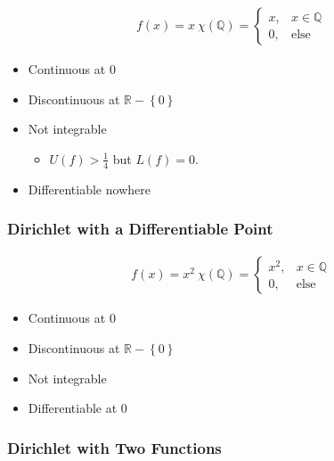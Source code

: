 \begin{align*}
f ( x ) = x~\chi({\mathbb{Q}}) = 
\begin{cases}
x, & x\in {\mathbb{Q}}\\
0, & \text{else}
\end{cases}
\end{align*}

\begin{itemize}
\tightlist
\item
  Continuous at 0
\item
  Discontinuous at \({\mathbb{R}}-\left\{{0}\right\}\)
\item
  Not integrable

  \begin{itemize}
  \tightlist
  \item
    \(U(f) > \frac 1 4\) but \(L(f) = 0\).
  \end{itemize}
\item
  Differentiable nowhere
\end{itemize}

\hypertarget{dirichlet-with-a-differentiable-point}{%
\subsubsection{Dirichlet with a Differentiable
Point}\label{dirichlet-with-a-differentiable-point}}

\begin{align*}
f ( x ) = x^2~\chi({\mathbb{Q}}) = \begin{cases}
x^2, & x\in {\mathbb{Q}}\\
0, & \text{else}
\end{cases}
\end{align*}

\begin{itemize}
\tightlist
\item
  Continuous at 0
\item
  Discontinuous at \({\mathbb{R}}-\left\{{0}\right\}\)
\item
  Not integrable
\item
  Differentiable at 0
\end{itemize}

\hypertarget{dirichlet-with-two-functions}{%
\subsubsection{Dirichlet with Two
Functions}\label{dirichlet-with-two-functions}}

